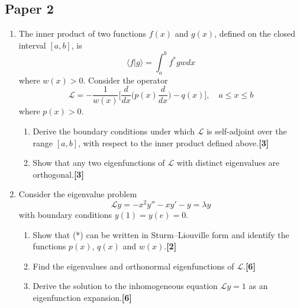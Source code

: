 \documentclass[a4paper]{article}
\begin{document}
\subsection{Paper 2}
\begin{qns}\leavevmode
\begin{enumerate}[label=(\roman*)]
\item The inner product of two functions $f(x)$ and $g(x)$, defined on the closed interval $[a, b]$, is
$$\langle f|g\rangle=\int_a^bf^*gwdx$$
where $w(x) > 0$. Consider the operator
$$\mathcal{L}=-\frac{1}{w(x)}\bigg[\frac{d}{dx}\bigg(p(x)\frac{d}{dx}\bigg)-q(x)\bigg],\quad a\leq x\leq b$$
where $p(x) > 0$.
\begin{enumerate}[label=(\alph*)]
\item Derive the boundary conditions under which $\mathcal{L}$ is self-adjoint over the range $[a, b]$, with respect to the inner product defined above.\hfill\textbf{[3]}
\item Show that any two eigenfunctions of $\mathcal{L}$ with distinct eigenvalues are orthogonal.\hfill\textbf{[3]}\end{enumerate}
\item Consider the eigenvalue problem
\begin{equation}
    \mathcal{L}y=-x^2y''-xy'-y=\lambda y\tag{*}
\end{equation}
with boundary conditions $y(1) = y(e) = 0$.
\begin{enumerate}[label=(\alph*)]
\item Show that (*) can be written in Sturm–Liouville form and identify the functions $p(x)$, $q(x)$ and $w(x)$.\hfill\textbf{[2]}
\item Find the eigenvalues and orthonormal eigenfunctions of $\mathcal{L}$.\hfill\textbf{[6]}
\item Derive the solution to the inhomogeneous equation $\mathcal{L}y=1$ as an eigenfunction expansion.\hfill\textbf{[6]}
\end{enumerate}
\end{enumerate}
\end{qns}
\end{document}
